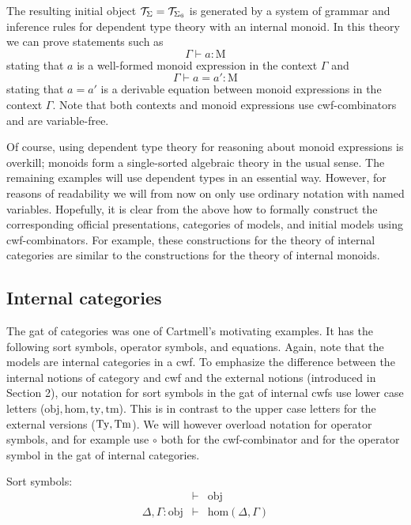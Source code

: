 \documentclass{lmcs}
\newcommand{\FYI}[1]{{\color{red}#1}}
\def\Obj{\mathrm{obj}}
\def\Hom{\mathrm{hom}}
\def\Mon{\mathrm{M}}
\newcommand{\ty}{\mathrm{ty}}
\newcommand{\tm}{\mathrm{tm}}
\begin{document}
The resulting initial object ${\mathcal T}_\Sigma = {\mathcal T}_{\Sigma_6}$ is generated by a system of grammar and inference rules for dependent type theory with an internal monoid. In this theory we can prove statements such as
$$
\Gamma \vdash a : \Mon
$$
stating that $a$ is a well-formed monoid expression in the context $\Gamma$ and
$$
\Gamma \vdash a = a': \Mon
$$
stating that $a = a'$ is a derivable equation between monoid expressions in the context $\Gamma$. Note that both contexts and monoid expressions use cwf-combinators and are variable-free.

Of course, using dependent type theory for reasoning about monoid expressions is overkill; monoids form a single-sorted algebraic theory in the usual sense.
The remaining examples will use dependent types in an essential way. However, for reasons of readability we will from now on only use ordinary notation with named variables. Hopefully, it is clear from the above how to formally construct the corresponding official \FYI{presentations}, categories of models, and initial models using cwf-combinators. For example, these constructions for the theory of internal categories are similar to the constructions for the theory of internal monoids.


\subsection{Internal categories} The gat of categories was one of Cartmell's motivating examples. It has the following sort symbols, operator symbols, and equations. Again, note that the models are internal categories in a cwf. To emphasize the difference between the internal notions of category and cwf and the external notions (introduced in Section 2), our notation for sort symbols in the gat of internal cwfs use lower case letters ($\Obj, \Hom, \ty, \tm$). This is in contrast to the upper case letters for the external versions ($\mathrm{Ty}, \mathrm{Tm}$). We will however overload notation for operator symbols, and for example use $\circ$ both for the cwf-combinator and for the operator symbol in the gat of internal categories.

Sort symbols:
\begin{eqnarray*}
&\vdash& \Obj\\
\Delta, \Gamma : \Obj &\vdash& \Hom(\Delta,\Gamma)\\
\end{eqnarray*}
\end{document}
